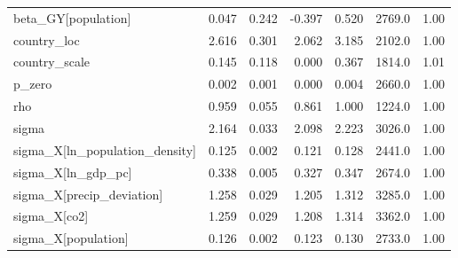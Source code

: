 \begin{table}[H]
\begin{tabular}{lrrrrrr}
beta\_GY[population] & 0.047 & 0.242 & -0.397 & 0.520 & 2769.0 & 1.00 \\
country\_loc & 2.616 & 0.301 & 2.062 & 3.185 & 2102.0 & 1.00 \\
country\_scale & 0.145 & 0.118 & 0.000 & 0.367 & 1814.0 & 1.01 \\
p\_zero & 0.002 & 0.001 & 0.000 & 0.004 & 2660.0 & 1.00 \\
rho & 0.959 & 0.055 & 0.861 & 1.000 & 1224.0 & 1.00 \\
sigma & 2.164 & 0.033 & 2.098 & 2.223 & 3026.0 & 1.00 \\
sigma\_X[ln\_population\_density] & 0.125 & 0.002 & 0.121 & 0.128 & 2441.0 & 1.00 \\
sigma\_X[ln\_gdp\_pc] & 0.338 & 0.005 & 0.327 & 0.347 & 2674.0 & 1.00 \\
sigma\_X[precip\_deviation] & 1.258 & 0.029 & 1.205 & 1.312 & 3285.0 & 1.00 \\
sigma\_X[co2] & 1.259 & 0.029 & 1.208 & 1.314 & 3362.0 & 1.00 \\
sigma\_X[population] & 0.126 & 0.002 & 0.123 & 0.130 & 2733.0 & 1.00 \\
\bottomrule
\end{tabular}
\end{table}
